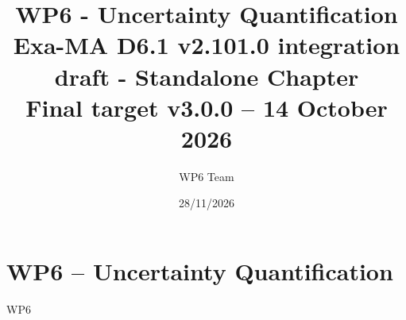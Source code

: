 \documentclass[11pt]{report}
\begin{document}
\title{WP6 - Uncertainty Quantification\\
\large Exa-MA D6.1 v2.101.0 integration draft - Standalone Chapter\\
\normalsize Final target v3.0.0 -- 14 October 2026}
\author{WP6 Team}
\date{28/11/2026}
\maketitle

\tableofcontents
\clearpage

\chapter{WP6 -- Uncertainty Quantification}
\label{chap:wp6}
{WP6}
\clearpage


\end{document}
